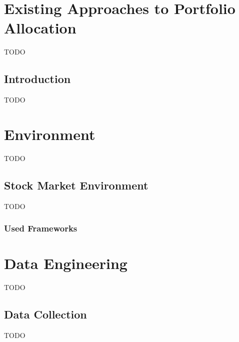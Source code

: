 \begin{itemize}




\chapter{Existing Approaches to Portfolio Allocation}\label{ch:existing-approaches-to-portfolio-allocation}
TODO


\section{Introduction}\label{sec:introduction}
TODO




\chapter{Environment}\label{ch:environment}
TODO


\section{Stock Market Environment}\label{sec:stock-market-environment}
TODO

\subsection{Used Frameworks}\label{subsec:used-frameworks}




\chapter{Data Engineering}\label{ch:data-engineering}
TODO


\section{Data Collection}\label{sec:data-collection}
TODO



\end{itemize}
